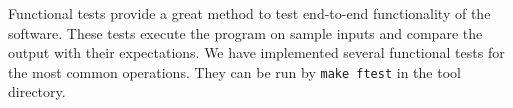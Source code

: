 Functional tests provide a great method to test end-to-end functionality
  of the software.
These tests execute the program on sample inputs and compare the output
  with their expectations.
We have implemented several functional tests for the most common
  operations.
They can be run by \texttt{make ftest} in the tool directory.
